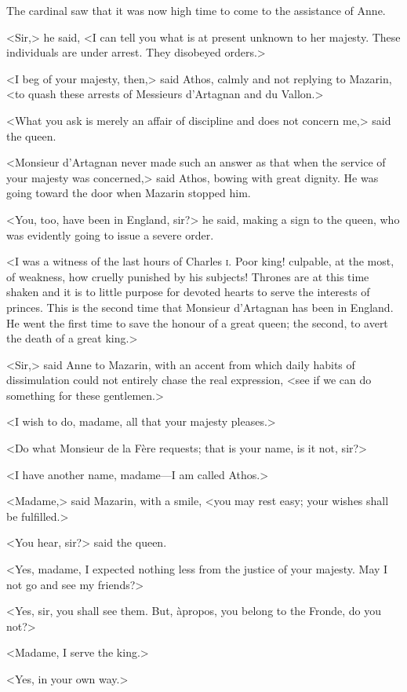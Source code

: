 The cardinal saw that it was now high time to come to the assistance of Anne.

<Sir,> he said, <I can tell you what is at present unknown to her majesty. These individuals are under arrest. They disobeyed orders.>

<I beg of your majesty, then,> said Athos, calmly and not replying to Mazarin, <to quash these arrests of Messieurs d'Artagnan and du Vallon.>

<What you ask is merely an affair of discipline and does not concern me,> said the queen.

<Monsieur d'Artagnan never made such an answer as that when the service of your majesty was concerned,> said Athos, bowing with great dignity. He was going toward the door when Mazarin stopped him.

<You, too, have been in England, sir?> he said, making a sign to the queen, who was evidently going to issue a severe order.

<I was a witness of the last hours of Charles \textsc{i}.  Poor king! culpable, at the most, of weakness, how cruelly punished by his subjects! Thrones are at this time shaken and it is to little purpose for devoted hearts to serve the interests of princes. This is the second time that Monsieur d'Artagnan has been in England. He went the first time to save the honour of a great queen; the second, to avert the death of a great king.>

<Sir,> said Anne to Mazarin, with an accent from which daily habits of dissimulation could not entirely chase the real expression, <see if we can do something for these gentlemen.>

<I wish to do, madame, all that your majesty pleases.>

<Do what Monsieur de la Fère requests; that is your name, is it not, sir?>

<I have another name, madame—I am called Athos.>

<Madame,> said Mazarin, with a smile, <you may rest easy; your wishes shall be fulfilled.>

<You hear, sir?> said the queen.

<Yes, madame, I expected nothing less from the justice of your majesty. May I not go and see my friends?>

<Yes, sir, you shall see them. But, àpropos, you belong to the Fronde, do you not?>

<Madame, I serve the king.>

<Yes, in your own way.>

